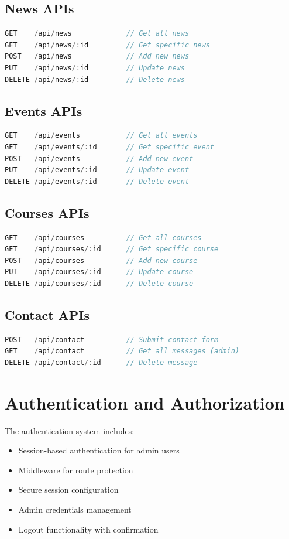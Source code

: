 \documentclass[12pt,a4paper]{report}
\begin{document}
\subsection{News APIs}
\begin{lstlisting}[language=JavaScript, caption=News API Endpoints]
GET    /api/news             // Get all news
GET    /api/news/:id         // Get specific news
POST   /api/news             // Add new news
PUT    /api/news/:id         // Update news
DELETE /api/news/:id         // Delete news
\end{lstlisting}

\subsection{Events APIs}
\begin{lstlisting}[language=JavaScript, caption=Events API Endpoints]
GET    /api/events           // Get all events
GET    /api/events/:id       // Get specific event
POST   /api/events           // Add new event
PUT    /api/events/:id       // Update event
DELETE /api/events/:id       // Delete event
\end{lstlisting}

\subsection{Courses APIs}
\begin{lstlisting}[language=JavaScript, caption=Courses API Endpoints]
GET    /api/courses          // Get all courses
GET    /api/courses/:id      // Get specific course
POST   /api/courses          // Add new course
PUT    /api/courses/:id      // Update course
DELETE /api/courses/:id      // Delete course
\end{lstlisting}

\subsection{Contact APIs}
\begin{lstlisting}[language=JavaScript, caption=Contact API Endpoints]
POST   /api/contact          // Submit contact form
GET    /api/contact          // Get all messages (admin)
DELETE /api/contact/:id      // Delete message
\end{lstlisting}

\section{Authentication and Authorization}
The authentication system includes:
\begin{itemize}
    \item Session-based authentication for admin users
    \item Middleware for route protection
    \item Secure session configuration
    \item Admin credentials management
    \item Logout functionality with confirmation
\end{itemize}
\end{document}
